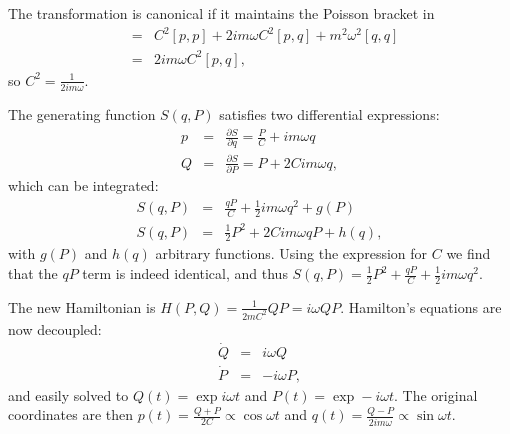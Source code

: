 \documentclass[letterpaper,11pt]{article}
\begin{document}
The transformation is canonical if it maintains the Poisson bracket in
\begin{eqnarray*}
 [P,Q] & = & C^2 [p,p] + 2 im\omega C^2 [p,q] + m^2\omega^2 [q,q] \\
 & = & 2 im\omega C^2 [p,q],
\end{eqnarray*}
so $C^2 = \frac{1}{2 im\omega}$.

The generating function $S(q,P)$ satisfies two differential expressions:
\begin{eqnarray*}
 p & = & \frac{\partial S}{\partial q} = \frac{P}{C} + im\omega q \\
 Q & = & \frac{\partial S}{\partial P} = P + 2 C im\omega q,
\end{eqnarray*}
which can be integrated:
\begin{eqnarray*}
 S(q,P) & = & \frac{q P}{C} + \frac{1}{2}im\omega q^2 + g(P) \\
 S(q,P) & = & \frac{1}{2} P^2 + 2 C im\omega q P + h(q),
\end{eqnarray*}
with $g(P)$ and $h(q)$ arbitrary functions.  Using the expression for $C$ we find that the $q P$ term is indeed identical, and thus $S(q,P) = \frac{1}{2} P^2 + \frac{qP}{C} + \frac{1}{2}im\omega q^2$.

The new Hamiltonian is $H(P,Q) = \frac{1}{2 m C^2} Q P = i\omega Q P$.  Hamilton's equations are now decoupled:
\begin{eqnarray*}
 \dot{Q} & = & i\omega Q \\
 \dot{P} & = & -i\omega P,
\end{eqnarray*}
and easily solved to $Q(t) = \exp i\omega t$ and $P(t) = \exp -i\omega t$.  The original coordinates are then $p(t) = \frac{Q + P}{2 C} \propto \cos\omega t$ and $q(t) = \frac{Q - P}{2 im\omega} \propto \sin\omega t$.
\end{document}
